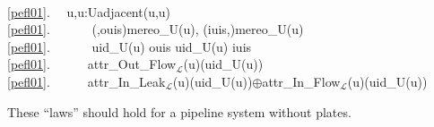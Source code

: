 \bp
\>\ \\
\ref{pefl01}.\ \ {\ALL} u,u{\PRIM}:U{\RDOT}adjacent(u,u{\PRIM}) {\DBLRIGHTARROW}\\
\ref{pefl01}.\ \ \ \ \ \  (,ouis){\EQ}mereo\_U(u), (iuis{\PRIM},){\EQ}mereo\_U(u{\PRIM}) \\
\ref{pefl01}.\ \ \ \ \ \  uid\_U(u{\PRIM}) {\ISIN} ouis {\WEDGE} uid\_U(u) {\ISIN} iuis {\PRIM}\\
\ref{pefl01}.\ \ \ \ \ \ attr\_Out\_Flow$_{\mathcal{L}}$(u)(uid\_U(u{\PRIM})) {\EQ} \\
\ref{pefl01}.\ \ \ \ \ \ attr\_In\_Leak$_{\mathcal{L}}$(u)(uid\_U(u))$\oplus$attr\_In\_Flow$_{\mathcal{L}}$(u{\PRIM})(uid\_U(u)) 
\ep

\noindent
\pind These ``laws'' should hold for a pipeline system without plates.
\afslut

